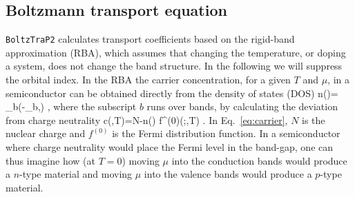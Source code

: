\documentclass[final,5p,times,twocolumn,sort&compress]{elsarticle}
\begin{document}
\subsection{Boltzmann transport equation}
\texttt{BoltzTraP2} calculates transport coefficients based on the rigid-band approximation (RBA), which assumes that changing the temperature, or doping a system, does not change the band structure. In the following we will suppress the orbital index. In the RBA the carrier concentration, for a given $T$ and $\mu$, in a semiconductor can be obtained directly from the density of states (DOS)
\beq
n(\varepsilon)= \int  \sum\limits_b\delta(\varepsilon-\varepsilon_{b,\bk}) ,
\label{eq:dos}
\eeq
where the subscript $b$ runs over bands, by calculating the deviation from charge neutrality
\beq
c(\mu,T)=N-\int n(\varepsilon) f^{(0)}(\varepsilon;\mu,T) \id \varepsilon.
\label{eq:carrier}
\eeq
In Eq.~\eqref{eq:carrier}, $N$ is the nuclear charge and $f^{(0)}$ is the Fermi distribution function. In a semiconductor where charge neutrality would place the Fermi level in the band-gap, one can thus imagine how (at $T=0$) moving $\mu$ into the conduction bands would produce a $n$-type material and moving $\mu$ into the valence bands would produce a $p$-type material.
\end{document}
